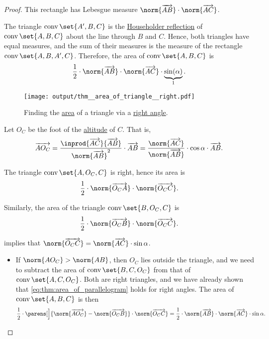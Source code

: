 \begin{proof}
  This rectangle has Lebesgue measure \( \norm{\vect{AB}} \cdot \norm{\vect{AC}} \).

  The triangle \( \conv\set{ A', B, C } \) is the \hyperref[def:rigid_motion/householder_reflection]{Householder reflection} of \( \conv\set{ A, B, C } \) about the line through \( B \) and \( C \). Hence, both triangles have equal measures, and the sum of their measures is the measure of the rectangle \( \conv\set{ A, B, A', C } \). Therefore, the area of \( \conv\set{ A, B, C } \) is
  \begin{equation*}
    \frac 1 2 \cdot \norm{\vect{AB}} \cdot \norm{\vect{AC}} \cdot \underbrace{ \sin(\alpha) }_{1}.
  \end{equation*}

  \begin{figure}[!ht]
    \centering
    \texttt{[image: output/thm\_\_area\_of\_triangle\_\_right.pdf]}
    \caption{Finding the \hyperref[def:figure_area]{area} of a triangle via a \hyperref[def:angle/right]{right angle}.}\label{fig:thm:area_of_triangle/right}
  \end{figure}

   Let \( O_C \) be the foot of the \hyperref[def:triangle_altitude]{altitude} of \( C \). That is,
  \begin{equation*}
    \vect{A O_C}
    =
    \frac {\inprod {\vect{AC}} {\vect{AB}}} {\norm{\vect{AB}}^2} \cdot \vect{AB}
    =
    \frac {\norm{\vect{AC}}} {\norm{\vect{AB}}} \cdot \cos \alpha \cdot \vect{AB}.
  \end{equation*}

  The triangle \( \conv\set{ A, O_C, C } \) is right, hence its area is
  \begin{equation*}
    \frac 1 2 \cdot \norm{\vect{ O_CA}} \cdot \norm{\vect{O_C C}}.
  \end{equation*}

  Similarly, the area of the triangle \( \conv\set{ B, O_C, C } \) is
  \begin{equation*}
    \frac 1 2 \cdot \norm{\vect{O_C B}} \cdot \norm{\vect{O_C C}}.
  \end{equation*}

   implies that \( \norm{\vect{O_C C}} = \norm{\vect{AC}} \cdot \sin \alpha \).

  \begin{itemize}
    \item If \( \norm{A O_C} > \norm{A B} \), then \( O_C \) lies outside the triangle, and we need to subtract the area of \( \conv\set{ B, C, O_C } \) from that of \( \conv\set{ A, C, O_C } \). Both are right triangles, and we have already shown that \eqref{eq:thm:area_of_parallelogram} holds for right angles. The area of \( \conv\set{ A, B, C } \) is then
    \begin{equation*}
      \frac 1 2 \cdot \parens[\Big]{ \norm{\vect{A O_C}} - \norm{\vect{O_C B}} } \cdot \norm{\vect{O_C C}} = \frac 1 2 \cdot \norm{\vect{AB}} \cdot \norm{\vect{AC}} \cdot \sin \alpha.
    \end{equation*}


\end{itemize}
\end{proof}
